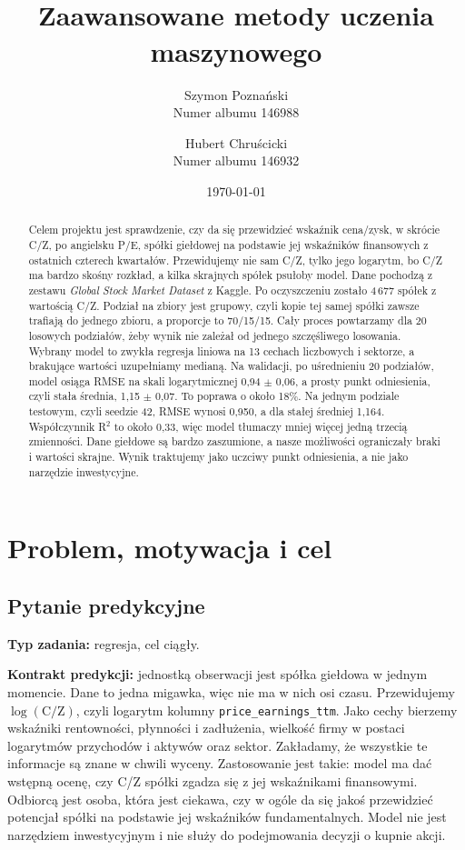 ﻿\documentclass[10pt,twocolumn,a4paper]{article}
\title{\TematProjektu\\[2mm]
\large Zaawansowane metody uczenia maszynowego}
\author{Szymon Poznański\\\small Numer albumu 146988
\and Hubert Chruścicki\\\small Numer albumu 146932}
\date{\quad \today}
\newcommand{\TypZadania}{regresja}
\begin{document}
\maketitle

\begin{abstract}
Celem projektu jest sprawdzenie, czy da się przewidzieć wskaźnik cena/zysk, w skrócie C/Z, po angielsku P/E, spółki giełdowej na podstawie jej wskaźników finansowych z ostatnich czterech kwartałów. Przewidujemy nie sam C/Z, tylko jego logarytm, bo C/Z ma bardzo skośny rozkład, a kilka skrajnych spółek psułoby model. Dane pochodzą z zestawu \emph{Global Stock Market Dataset} z Kaggle. Po oczyszczeniu zostało 4\,677 spółek z wartością C/Z. Podział na zbiory jest grupowy, czyli kopie tej samej spółki zawsze trafiają do jednego zbioru, a proporcje to 70/15/15. Cały proces powtarzamy dla 20 losowych podziałów, żeby wynik nie zależał od jednego szczęśliwego losowania. Wybrany model to zwykła regresja liniowa na 13 cechach liczbowych i sektorze, a brakujące wartości uzupełniamy medianą. Na walidacji, po uśrednieniu 20 podziałów, model osiąga RMSE na skali logarytmicznej 0,94 $\pm$ 0,06, a prosty punkt odniesienia, czyli stała średnia, 1,15 $\pm$ 0,07. To poprawa o około 18\%. Na jednym podziale testowym, czyli seedzie 42, RMSE wynosi 0,950, a dla stałej średniej 1,164. Współczynnik R$^2$ to około 0,33, więc model tłumaczy mniej więcej jedną trzecią zmienności. Dane giełdowe są bardzo zaszumione, a nasze możliwości ograniczały braki i wartości skrajne. Wynik traktujemy jako uczciwy punkt odniesienia, a nie jako narzędzie inwestycyjne.
\end{abstract}

\section{Problem, motywacja i cel}
\subsection{Pytanie predykcyjne}
\textbf{Typ zadania:} \TypZadania{}, cel ciągły.

\noindent\textbf{Kontrakt predykcji:}
jednostką obserwacji jest spółka giełdowa w jednym momencie. Dane to jedna migawka, więc nie ma w nich osi czasu. Przewidujemy $\log(\text{C/Z})$, czyli logarytm kolumny \texttt{price\_earnings\_ttm}. Jako cechy bierzemy wskaźniki rentowności, płynności i zadłużenia, wielkość firmy w postaci logarytmów przychodów i aktywów oraz sektor. Zakładamy, że wszystkie te informacje są znane w chwili wyceny. Zastosowanie jest takie: model ma dać wstępną ocenę, czy C/Z spółki zgadza się z jej wskaźnikami finansowymi. Odbiorcą jest osoba, która jest ciekawa, czy w ogóle da się jakoś przewidzieć potencjał spółki na podstawie jej wskaźników fundamentalnych. Model nie jest narzędziem inwestycyjnym i nie służy do podejmowania decyzji o kupnie akcji.
\end{document}
